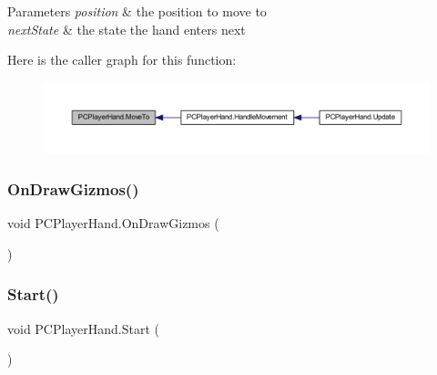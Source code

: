 \begin{DoxyParams}{Parameters}
{\em position} & the position to move to\\
\hline
{\em next\+State} & the state the hand enters next\\
\hline
\end{DoxyParams}
Here is the caller graph for this function\+:
\nopagebreak
\begin{figure}[H]
\begin{center}
\leavevmode
\includegraphics[width=350pt]{class_p_c_player_hand_a338f6e5898a4953d48c046354ffef9e2_icgraph}
\end{center}
\end{figure}
\mbox{\label{class_p_c_player_hand_a40a567183ee039605d5778060e5ce17a}} 
\subsubsection{\texorpdfstring{On\+Draw\+Gizmos()}{OnDrawGizmos()}}
{\footnotesize\ttfamily void P\+C\+Player\+Hand.\+On\+Draw\+Gizmos (\begin{DoxyParamCaption}{ }\end{DoxyParamCaption})\hspace{0.3cm}{\ttfamily [private]}}

\mbox{\label{class_p_c_player_hand_aa3eed40e80c66f9e85905cf2c2c4fcbe}} 
\subsubsection{\texorpdfstring{Start()}{Start()}}
{\footnotesize\ttfamily void P\+C\+Player\+Hand.\+Start (\begin{DoxyParamCaption}{ }\end{DoxyParamCaption})\hspace{0.3cm}{\ttfamily [private]}}

